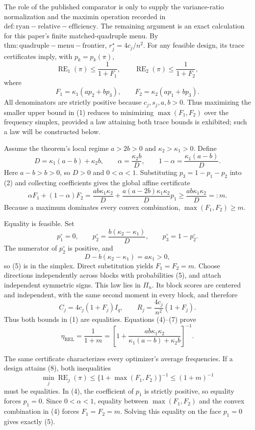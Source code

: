 The role of the published comparator is only to supply the variance-ratio normalization and the maximin operation recorded in \(\mathrm{def:ryan-relative-efficiency}\). The remaining argument is an exact calculation for this paper's finite matched-quadruple menu. By \(\mathrm{thm:quadruple-menu-frontier}\), \(r_j^\star=4c_j/n^2\). For any feasible design, its trace certificates imply, with \(p_k=p_k(\pi)\),
\[
\operatorname{RE}_1(\pi)\le \frac1{1+F_1},
\qquad
\operatorname{RE}_2(\pi)\le \frac1{1+F_2}, \tag{1}
\]
where
\[
F_1=\kappa_1(ap_2+bp_3),
\qquad
F_2=\kappa_2(ap_1+bp_3). \tag{2}
\]
All denominators are strictly positive because \(c_j,s_j,a,b>0\). Thus maximizing the smaller upper bound in (1) reduces to minimizing \(\max(F_1,F_2)\) over the frequency simplex, provided a law attaining both trace bounds is exhibited; such a law will be constructed below.

Assume the theorem's local regime \(a>2b>0\) and \(\kappa_2>\kappa_1>0\). Define
\[
D=\kappa_1(a-b)+\kappa_2b,
\qquad
\alpha=\frac{\kappa_2b}{D},
\qquad
1-\alpha=\frac{\kappa_1(a-b)}D. \tag{3}
\]
Here \(a-b>b>0\), so \(D>0\) and \(0<\alpha<1\). Substituting \(p_3=1-p_1-p_2\) into (2) and collecting coefficients gives the global affine certificate
\[
\alpha F_1+(1-\alpha)F_2
=\frac{ab\kappa_1\kappa_2}{D}
+\frac{a(a-2b)\kappa_1\kappa_2}{D}p_1
\ge \frac{ab\kappa_1\kappa_2}{D}=:m. \tag{4}
\]
Because a maximum dominates every convex combination, \(\max(F_1,F_2)\ge m\).

Equality is feasible. Set
\[
p_1^\circ=0,
\qquad
p_2^\circ=\frac{b(\kappa_2-\kappa_1)}D,
\qquad
p_3^\circ=1-p_2^\circ. \tag{5}
\]
The numerator of \(p_2^\circ\) is positive, and
\[
D-b(\kappa_2-\kappa_1)=a\kappa_1>0, \tag{6}
\]
so (5) is in the simplex. Direct substitution yields \(F_1=F_2=m\). Choose directions independently across blocks with probabilities (5), and attach independent symmetric signs. This law lies in \(\Pi_n\). Its block scores are centered and independent, with the same second moment in every block, and therefore
\[
C_j=4c_j(1+F_j)I_q,
\qquad
R_j=\frac{4c_j}{n^2}(1+F_j). \tag{7}
\]
Thus both bounds in (1) are equalities. Equations (4)--(7) prove
\[
\eta_{\mathrm{REL}}
=\frac1{1+m}
=\left[1+\frac{ab\kappa_1\kappa_2}{\kappa_1(a-b)+\kappa_2b}\right]^{-1}. \tag{8}
\]

The same certificate characterizes every optimizer's average frequencies. If a design attains (8), both inequalities
\[
\min_j\operatorname{RE}_j(\pi)
\le \{1+\max(F_1,F_2)\}^{-1}
\le (1+m)^{-1} \tag{9}
\]
must be equalities. In (4), the coefficient of \(p_1\) is strictly positive, so equality forces \(p_1=0\). Since \(0<\alpha<1\), equality between \(\max(F_1,F_2)\) and the convex combination in (4) forces \(F_1=F_2=m\). Solving this equality on the face \(p_1=0\) gives exactly (5).

